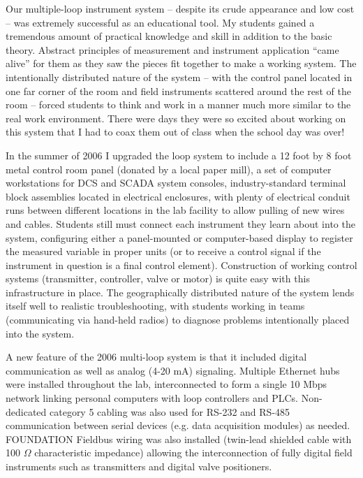 Our multiple-loop instrument system -- despite its crude appearance and low cost -- was extremely successful as an educational tool.  My students gained a tremendous amount of practical knowledge and skill in addition to the basic theory.  Abstract principles of measurement and instrument application ``came alive'' for them as they saw the pieces fit together to make a working system.  The intentionally distributed nature of the system -- with the control panel located in one far corner of the room and field instruments scattered around the rest of the room -- forced students to think and work in a manner much more similar to the real work environment.  There were days they were so excited about working on this system that I had to coax them out of class when the school day was over!

\vskip 10pt

In the summer of 2006 I upgraded the loop system to include a 12 foot by 8 foot metal control room panel (donated by a local paper mill), a set of computer workstations for DCS and SCADA system consoles, industry-standard terminal block assemblies located in electrical enclosures, with plenty of electrical conduit runs between different locations in the lab facility to allow pulling of new wires and cables.  Students still must connect each instrument they learn about into the system, configuring either a panel-mounted or computer-based display to register the measured variable in proper units (or to receive a control signal if the instrument in question is a final control element).  Construction of working control systems (transmitter, controller, valve or motor) is quite easy with this infrastructure in place.  The geographically distributed nature of the system lends itself well to realistic troubleshooting, with students working in teams (communicating via hand-held radios) to diagnose problems intentionally placed into the system.

A new feature of the 2006 multi-loop system is that it included digital communication as well as analog (4-20 mA) signaling.  Multiple Ethernet hubs were installed throughout the lab, interconnected to form a single 10 Mbps network linking personal computers with loop controllers and PLCs.  Non-dedicated category 5 cabling was also used for RS-232 and RS-485 communication between serial devices (e.g. data acquisition modules) as needed.  FOUNDATION Fieldbus wiring was also installed (twin-lead shielded cable with 100 $\Omega$ characteristic impedance) allowing the interconnection of fully digital field instruments such as transmitters and digital valve positioners.

